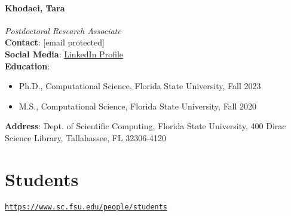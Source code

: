 \documentclass[12pt,a4paper]{article}
\begin{document}
\paragraph{Khodaei, Tara}
\textit{Postdoctoral Research Associate}\\
\textbf{Contact}: [email protected]\\
\textbf{Social Media}: \href{https://www.linkedin.com/in/tara-khodaei-80b72a11b/}{LinkedIn Profile}\\
\textbf{Education}:
\begin{itemize}
    \item Ph.D., Computational Science, Florida State University, Fall 2023
    \item M.S., Computational Science, Florida State University, Fall 2020
\end{itemize}
\textbf{Address}: Dept. of Scientific Computing, Florida State University, 400 Dirac Science Library, Tallahassee, FL 32306-4120

\section{Students}
\texttt{\url{https://www.sc.fsu.edu/people/students}}
\end{document}
